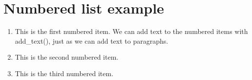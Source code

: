 \documentclass[a4paper]{report}
\begin{document}
\chapter{Numbered list example}
\begin{enumerate}
\item This is the first numbered item. We can add text to the numbered items with add\_text(), just as we can add text to paragraphs.
\item This is the second numbered item.
\item This is the third numbered item.
\end{enumerate}
\end{document}
